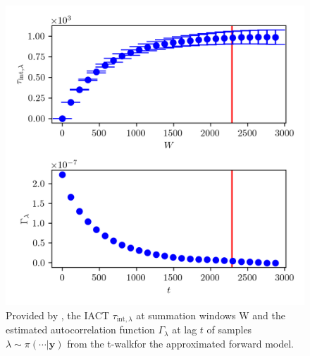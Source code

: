 \begin{figure}[ht!]
	\centering
	\includegraphics{UwerrTauIntTWalk1.png}
	\caption[IACT and autocorrelation function of samples $\lambda \sim \pi(\cdot|\bm{y})$, for approximated model.]{Provided by \cite{drikHesse}, the IACT $\tau_{\text{int},\lambda}$ at summation windows W and the estimated autocorrelation function $\Gamma_{\lambda}$ at lag $t$ of samples $\lambda \sim \pi( \cdots| \bm{y})$ from the t-walkfor the approximated forward model.}
	\label{fig:TWalkIATC2}
\end{figure}


